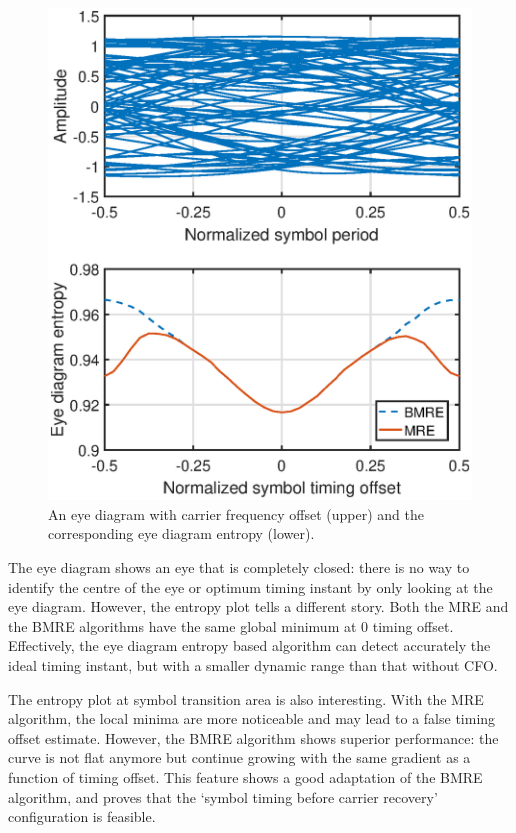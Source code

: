 \documentclass[journal,comsoc,onecolumn, 12pt,draftclsnofoot]{IEEEtran}
\begin{document}
\begin{figure}[ht]
\centering
\includegraphics[width=3 in]{pic/timing_freq.eps}
\caption{An eye diagram with carrier frequency offset (upper) and the corresponding eye diagram entropy (lower).}
\label{fig:timing_freq} 
\end{figure}

The eye diagram shows an eye that is completely closed: there is no way to identify the centre of the eye or optimum timing instant by only looking at the eye diagram.
However, the entropy plot tells a different story.
Both the MRE and the BMRE algorithms have the same global minimum at 0 timing offset. 
Effectively, the eye diagram entropy based algorithm can detect accurately the ideal timing instant,
but with a smaller dynamic range than that without CFO.

The entropy plot at symbol transition area is also interesting.
With the MRE algorithm, the local minima are more noticeable and may lead to a false timing offset estimate.
However, the BMRE algorithm shows superior performance:
the curve is not flat anymore but continue growing with the same gradient as a function of timing offset.
This feature shows a good adaptation of the BMRE algorithm, and proves that the `symbol timing before carrier recovery' configuration is feasible.
\end{document}
